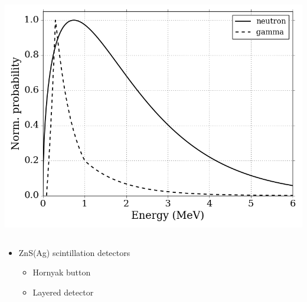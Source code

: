 \documentclass[fleqn]{beamer}
\begin{document}
\begin{frame}
\begin{columns}[c]
      \begin{column}{.5\textwidth}
      \includegraphics[width = \textwidth]{ng_spec}
      \end{column}
     \end{columns}
    \end{frame}
    
    \begin{frame}
    \begin{itemize}
     \item ZnS(Ag) scintillation detectors
     \begin{itemize} 
      \item Hornyak button
      \item Layered detector
     \end{itemize}
    \end{itemize}
    \end{frame}
\end{document}
